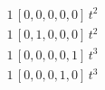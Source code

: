 \begin{align*}
1\,[0,0,0,0,0]\,t^{2} \\
1\,[0,1,0,0,0]\,t^{2} \\
1\,[0,0,0,0,1]\,t^{3} \\
1\,[0,0,0,1,0]\,t^{3}
\end{align*}
